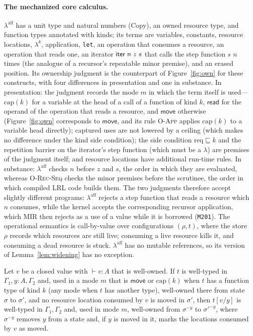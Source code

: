 \paragraph{The mechanized core calculus.}
$\lambda^{\mathrm{aff}}$ has a unit type and natural numbers (Copy), an owned resource type, and function types annotated with kinds; its terms are variables, constants, resource locations, $\lambda^k$, application, \lstinline|let|, an operation that consumes a resource, an operation that reads one, an iterator $\mathsf{iter}\;n\;z\;s$ that calls the step function $s$ $n$ times (the analogue of a recursor's repeatable minor premise), and an erased position.
Its ownership judgment is the counterpart of Figure~\ref{fig:own} for these constructs, with four differences in presentation and one in substance.
In presentation: the judgment records the mode $m$ in which the term itself is used---$\mathrm{cap}(k)$ for a variable at the head of a call of a function of kind $k$, $\mathsf{read}$ for the operand of the operation that reads a resource, and $\mathsf{move}$ otherwise (Figure~\ref{fig:own} corresponds to $\mathsf{move}$, and its rule \textsc{O-App} applies $\mathrm{cap}(k)$ to a variable head directly); captured uses are not lowered by a ceiling (which makes no difference under the kind side condition); the side condition $\mathrm{req} \sqsubseteq k$ and the repetition barrier on the iterator's step function (which must be a $\lambda$) are premises of the judgment itself; and resource locations have additional run-time rules.
In substance: $\lambda^{\mathrm{aff}}$ checks $n$ before $z$ and $s$, the order in which they are evaluated, whereas \textsc{O-Rec-Seq} checks the minor premises before the scrutinee, the order in which compiled LRL code builds them.
The two judgments therefore accept slightly different programs: $\lambda^{\mathrm{aff}}$ rejects a step function that reads a resource which $n$ consumes, while the kernel accepts the corresponding recursor application, which MIR then rejects as a use of a value while it is borrowed (\texttt{M201}).
The operational semantics is call-by-value over configurations $(\rho, t)$, where the store $\rho$ records which resources are still live; consuming a live resource kills it, and consuming a dead resource is stuck.
$\lambda^{\mathrm{aff}}$ has no mutable references, so its version of Lemma~\ref{lem:widening} has no exception.

\begin{lemma}\label{lem:subst}
Let $v$ be a closed value with $\vdash v : A$ that is well-owned.
If $t$ is well-typed in $\Gamma_1, y{:}A, \Gamma_2$ and, used in a mode $m$ that is $\mathsf{move}$ or $\mathrm{cap}(k)$ when $t$ has a function type of kind $k$ (any mode when $t$ has another type), well-owned there from state $\sigma$ to $\sigma'$, and no resource location consumed by $v$ is moved in $\sigma'$, then $t[v/y]$ is well-typed in $\Gamma_1, \Gamma_2$ and, used in mode $m$, well-owned from $\sigma^{-y}$ to $\sigma'^{-y}$, where $\sigma^{-y}$ removes $y$ from a state and, if $y$ is moved in it, marks the locations consumed by $v$ as moved.
\end{lemma}

